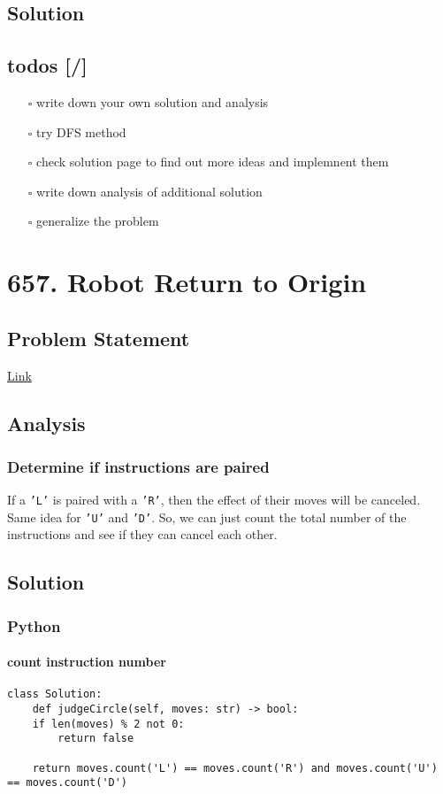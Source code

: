 \documentclass[12pt]{article}
\begin{document}
\subsection{Solution}
\label{sec:org698ef6d}
\subsection{todos [/]}
\label{sec:orgdee9547}
\begin{itemize}
\item[{$\square$}] write down your own solution and analysis
\item[{$\square$}] try DFS method
\item[{$\square$}] check solution page to find out more ideas and implemnent them
\item[{$\square$}] write down analysis of additional solution
\item[{$\square$}] generalize the problem
\end{itemize}
\section{657. Robot Return to Origin}
\label{sec:orgda4de64}
\subsection{Problem Statement}
\label{sec:orgb4ebf05}
\href{https://leetcode.com/problems/robot-return-to-origin/}{Link}
\subsection{Analysis}
\label{sec:org2b274c0}
\subsubsection{Determine if instructions are paired}
\label{sec:orgb9339e9}
If a \texttt{'L'} is paired with a \texttt{'R'}, then the effect of their moves will be canceled. Same idea for \texttt{'U'} and \texttt{'D'}. So, we can just count the total number of the instructions and see if they can cancel each other.
\subsection{Solution}
\label{sec:org8bc90c7}
\subsubsection{Python}
\label{sec:orged46449}
\paragraph{count instruction number}
\label{sec:org7ed810b}
\begin{verbatim}
class Solution:
    def judgeCircle(self, moves: str) -> bool:
	if len(moves) % 2 not 0:
	    return false

	return moves.count('L') == moves.count('R') and moves.count('U') == moves.count('D')
\end{verbatim}
\end{document}
